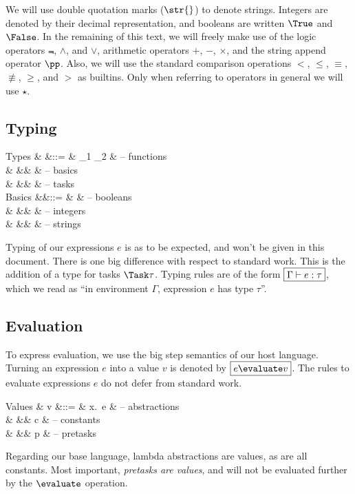We will use double quotation marks ($\str{}$) to denote strings.
Integers are denoted by their decimal representation,
and booleans are written $\True$ and $\False$.
In the remaining of this text,
we will freely make use of the logic operators $\Not$, $\land$, and $\lor$,
arithmetic operators $+$, $-$, $\times$,
and the string append operator $\pp$.
Also, we will use the standard comparison operations $<$, $\le$, $\equiv$, $\nequiv$, $\ge$, and $>$
as builtins.
Only when referring to operators in general we will use $\star$.


\subsection{Typing}

\begin{grammar}
  Types
    & \tau &::= & \tau_1 \to \tau_2 & – functions \\
    &      &\mid& \beta             & – basics \\
    &      &\mid& \Task \tau        & – tasks \\
  Basics
    &\beta &::= & \Bool             & – booleans \\
    &      &\mid& \Int              & – integers \\
    &      &\mid& \String           & – strings \\
\end{grammar}
Typing of our expressions $e$ is as to be expected,
and won't be given in this document.
There is one big difference with respect to standard work.
This is the addition of a type for tasks $\Task \tau$.
Typing rules are of the form $\boxed{\Gamma \vdash e : \tau}$,
which we read as \enquote{in environment $\Gamma$, expression $e$ has type $\tau$}.


\subsection{Evaluation}

To express evaluation,
we use the big step semantics of our host language.
Turning an expression $e$ into a value $v$ is denoted by $\boxed{e \evaluate v}$.
The rules to evaluate expressions $e$ do not defer from standard work.

\begin{grammar}
  Values
    & v &::= & \lambda x.\ e  & – abstractions \\
    &   &\mid& c              & – constants \\
    &   &\mid& p              & – pretasks \\
\end{grammar}

Regarding our base language, lambda abstractions are values, as are all constants.
Most important, \emph{pretasks are values},
and will not be evaluated further by the $\evaluate$ operation.

